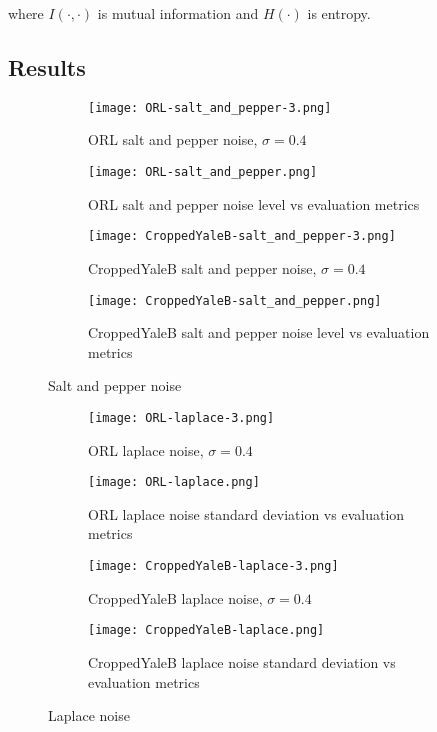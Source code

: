 \documentclass{article} %
\begin{document}
where $I \left ( \cdot , \cdot \right )$ is mutual information and $H \left ( \cdot \right )$ is entropy.

\subsection{Results}
\begin{figure}
\begin{subfigure}{\linewidth}
\texttt{[image: ORL-salt\_and\_pepper-3.png]}
\caption{ORL salt and pepper noise, $\sigma=0.4$}
\end{subfigure}
\begin{subfigure}{\linewidth}
\texttt{[image: ORL-salt\_and\_pepper.png]}
\caption{ORL salt and pepper noise level vs evaluation metrics}
\end{subfigure}
\begin{subfigure}{\linewidth}
\texttt{[image: CroppedYaleB-salt\_and\_pepper-3.png]}
\caption{CroppedYaleB salt and pepper noise, $\sigma=0.4$}
\end{subfigure}
\begin{subfigure}{\linewidth}
\texttt{[image: CroppedYaleB-salt\_and\_pepper.png]}
\caption{CroppedYaleB salt and pepper noise level vs evaluation metrics}
\end{subfigure}
\caption{Salt and pepper noise}
\end{figure}

\begin{figure}
\begin{subfigure}{\linewidth}
\texttt{[image: ORL-laplace-3.png]}
\caption{ORL laplace noise, $\sigma=0.4$}
\end{subfigure}
\begin{subfigure}{\linewidth}
\texttt{[image: ORL-laplace.png]}
\caption{ORL laplace noise standard deviation vs evaluation metrics}
\end{subfigure}
\begin{subfigure}{\linewidth}
\texttt{[image: CroppedYaleB-laplace-3.png]}
\caption{CroppedYaleB laplace noise, $\sigma=0.4$}
\end{subfigure}
\begin{subfigure}{\linewidth}
\texttt{[image: CroppedYaleB-laplace.png]}
\caption{CroppedYaleB laplace noise standard deviation vs evaluation metrics}
\end{subfigure}
\caption{Laplace noise}
\end{figure}
\end{document}
